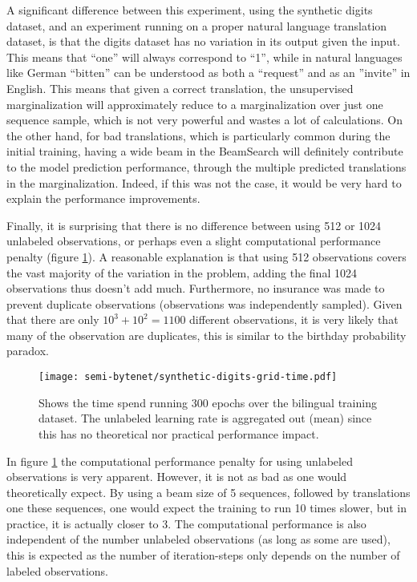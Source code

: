 A significant difference between this experiment, using the synthetic digits dataset, and an experiment running on a proper natural language translation dataset, is that the digits dataset has no variation in its output given the input. This means that ``one'' will always correspond to ``1'', while in natural languages like German ``bitten'' can be understood as both a ``request'' and as an ''invite'' in English. This means that given a correct translation, the unsupervised marginalization will approximately reduce to a marginalization over just one sequence sample, which is not very powerful and wastes a lot of calculations. On the other hand, for bad translations, which is particularly common during the initial training, having a wide beam in the BeamSearch will definitely contribute to the model prediction performance, through the multiple predicted translations in the marginalization. Indeed, if this was not the case, it would be very hard to explain the performance improvements.

Finally, it is surprising that there is no difference between using 512 or 1024 unlabeled observations, or perhaps even a slight computational performance penalty (figure \ref{fig:result:semi-bytenet:time}). A reasonable explanation is that using 512 observations covers the vast majority of the variation in the problem, adding the final 1024 observations thus doesn't add much. Furthermore, no insurance was made to prevent duplicate observations (observations was independently sampled). Given that there are only $10^3 + 10^2 = 1100$ different observations, it is very likely that many of the observation are duplicates, this is similar to the birthday probability paradox.

\begin{figure}[h]
    \centering
    \texttt{[image: semi-bytenet/synthetic-digits-grid-time.pdf]}
    \caption{Shows the time spend running 300 epochs over the bilingual training dataset. The unlabeled learning rate is aggregated out (mean) since this has no theoretical nor practical performance impact.}
    \label{fig:result:semi-bytenet:time}
\end{figure}

In figure \ref{fig:result:semi-bytenet:time} the computational performance penalty for using unlabeled observations is very apparent. However, it is not as bad as one would theoretically expect. By using a beam size of 5 sequences, followed by translations one these sequences, one would expect the training to run 10 times slower, but in practice, it is actually closer to 3. The computational performance is also independent of the number unlabeled observations (as long as some are used), this is expected as the number of iteration-steps only depends on the number of labeled observations.

